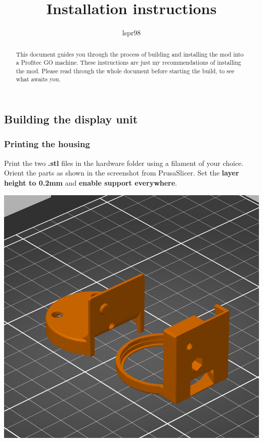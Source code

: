 \documentclass[]{article}
\title{Installation instructions}
\author{lspr98}
\begin{document}
\maketitle

\begin{abstract}
	This document guides you through the process of building and installing the mod into a Profitec GO machine. These instructions are just my recommendations of installing the mod. Please read through the whole document before starting the build, to see what awaits you. 
\end{abstract}

\section{}
\subsection{Building the display unit}
\subsubsection{Printing the housing}
\begin{minipage}[t]{0.5\linewidth}
	\vspace{0pt}
	Print the two \textbf{.stl} files in the hardware folder using a filament of your choice. Orient the parts as shown in the screenshot from PrusaSlicer. Set the \textbf{layer height to 0.2mm} and \textbf{enable support everywhere}.
\end{minipage}
\hfill
\begin{minipage}[t]{0.4\linewidth}
	\vspace{0pt}
	\includegraphics[width=\linewidth]{images/01_displayunit/00_print_parts.jpg}
\end{minipage}
\end{document}

